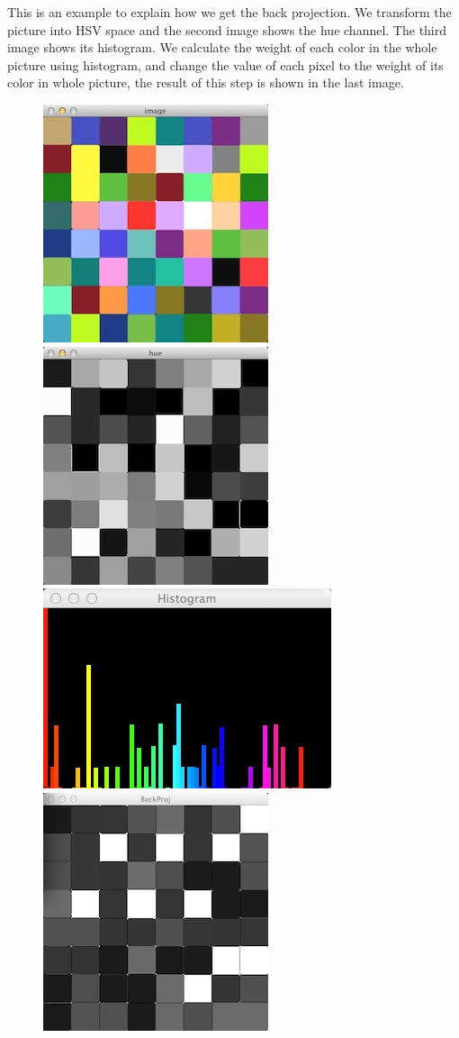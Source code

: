 \documentclass[a4paper,12pt]{report}
\begin{document}
This is an example to explain how we get the back projection.   We transform the picture into HSV space and the second image shows the hue channel. The third image shows its histogram.
We calculate the weight of each color in the whole picture using histogram, and change the value of each pixel to the weight of its color in whole picture, the result of this step is shown in the last image.
  \begin{figure}[h]
    \centering
    \includegraphics[scale=0.55]{backpro1.jpeg}
     \includegraphics[scale=0.55]{backpro2.jpeg}
     \includegraphics[scale=0.62]{backpro3.jpg}
     \includegraphics[scale=0.55]{backpro4.jpeg}


\end{figure}
\end{document}
